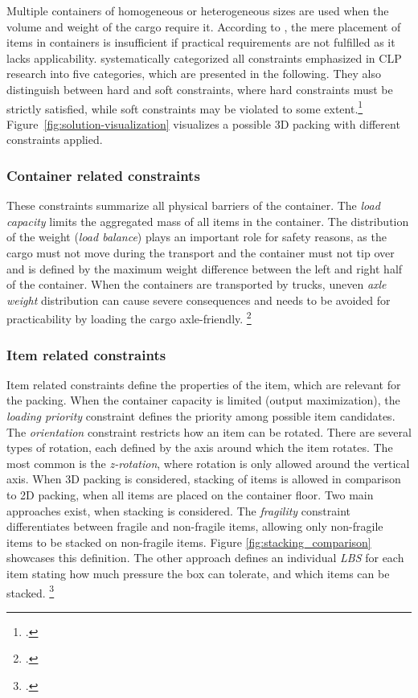 Multiple containers of homogeneous or heterogeneous sizes are used when the volume and weight
of the cargo require it.
According to \textcite{bischoff_issues_1995}, the mere placement of items in containers is insufficient
if practical requirements are not fulfilled as it lacks applicability.
\textcite{bortfeldt_constraints_2013} systematically categorized all constraints emphasized in \gls{CLP} research
into five categories, which are presented in the following. They also distinguish between hard and soft constraints,
where hard constraints must be strictly satisfied, while soft constraints may be violated
to some extent.\footcites(cf.)()[pp. 1f]{bortfeldt_constraints_2013}[pp. 1--2]{bischoff_issues_1995}
Figure~\ref{fig:solution-visualization} visualizes a possible 3D packing with different constraints applied.

\subsubsection{Container related constraints}
These constraints summarize all physical barriers of the container. The \textit{load capacity} limits the aggregated
mass of all items in the container. The distribution of the weight (\textit{load balance})
plays an important role for safety reasons, as the cargo must not move during the transport and the container
must not tip over and is defined by the maximum weight difference between the left and right half of the container.
When the containers are transported by trucks, uneven \textit{axle weight} distribution can cause severe
consequences and needs to be avoided for practicability by loading the cargo axle-friendly. \footcite[cf.][pp. 849--850]{krebs_advanced_2021}

\subsubsection{Item related constraints}
Item related constraints define the properties of the item, which are relevant
for the packing. When the container capacity is limited (output maximization),
the \textit{loading priority} constraint defines the priority among possible
item candidates. The \textit{orientation} constraint restricts how an item can be rotated.
There are several types of rotation, each defined by the axis around which the item rotates.
The most common is the \textit{z-rotation}, where rotation is only allowed around the vertical axis.
When 3D packing is considered, stacking of items is allowed in comparison to 2D packing, when all
items are placed on the container floor. Two main approaches exist, when stacking is considered.
The \textit{fragility} constraint differentiates between fragile and non-fragile items,
allowing only non-fragile items to be stacked on non-fragile items. Figure \ref{fig:stacking_comparison} showcases
this definition. The other approach defines an individual \textit{\gls{LBS}} for each
item stating how much pressure the box can tolerate, and which items can be stacked. \footcite[cf.][pp. 847--848]{krebs_advanced_2021}

